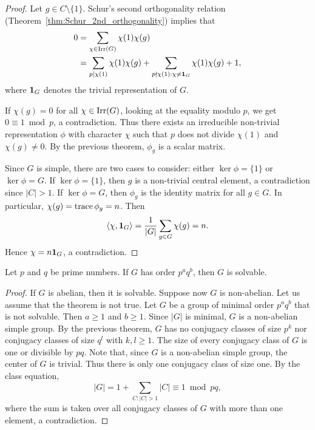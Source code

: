 \begin{proof}
	Let $g\in C\setminus\{1\}$. Schur's second orthogonality relation 
    (Theorem~\ref{thm:Schur_2nd_orthogonality}) 
    implies that 
	\begin{equation}
	\label{eq:Burnside}
	\begin{aligned}
		0&=\sum_{\chi\in\operatorname{Irr}(G)}\chi(1)\chi(g)\\
		&=\sum_{p\mid\chi(1)}\chi(1)\chi(g)+\sum_{p\nmid\chi(1):\chi\ne\mathbf{1}_G}\chi(1)\chi(g)+1,
	\end{aligned}
	\end{equation}
	where $\mathbf{1}_G$ denotes the trivial representation of $G$. 
	
    If $\chi(g)=0$ for all
	$\chi\in\operatorname{Irr}(G)$, looking at the equality modulo $p$, we
    get $0\equiv 1\bmod p$, a contradiction. 
    Thus  
	there exists an irreducible non-trivial representation 
	$\phi$ with character $\chi$ such that $p$ does not divide
	$\chi(1)$ and $\chi(g)\ne0$. By the previous theorem, 
	$\phi_g$ is a scalar matrix. 
    
    Since $G$ is simple, there are two cases to consider: 
    either $\ker\phi=\{1\}$ or $\ker\phi=G$. 
    If $\ker\phi=\{1\}$, then 
	$g$ is a non-trivial central element, a contradiction since 
    $|C|>1$. If $\ker\phi=G$, 
    then $\phi_g$ is the identity matrix for all $g\in G$. 
    In particular, $\chi(g)=\operatorname{trace}\phi_g=n$. Then
    \[
    \langle\chi,\mathbf{1}_G\rangle=\frac{1}{|G|}\sum_{g\in G}\chi(g)
    =n.
    \]
    Hence $\chi=n\mathbf{1}_G$, a contradiction.  
\end{proof}

\begin{theorem}[Burnside]
  \label{thm:pq}
  Let $p$ and $q$ be prime numbers. If $G$ has order $p^aq^b$, then $G$ is solvable.
\end{theorem}

\begin{proof}
	If $G$ is abelian, then it is solvable. 
	Suppose now $G$ is non-abelian.
	Let us assume that the theorem is not true. Let $G$ be a group
	of minimal order $p^aq^b$
	that is not solvable. 
    Then $a\geq1$ and $b\geq1$. 
    Since $|G|$ is minimal, $G$ is a non-abelian simple group.
	By the previous theorem, 
	$G$ has no conjugacy classes of size $p^k$ nor 
	conjugacy classes of size $q^l$ with $k,l\geq1$. The size
	of every conjugacy class of $G$ is one or divisible by $pq$. 
	Note that, since $G$ is a non-abelian simple group,
	the center of $G$ is trivial.
	Thus there is only one conjugacy class of size one.
	By the class
	equation,
	\[
		|G|=1+\sum_{C:|C|>1}|C|\equiv 1 \bmod pq,
	\]
	where the sum is taken over all conjugacy classes of $G$ 
	with more than one element, a contradiction.
\end{proof}

